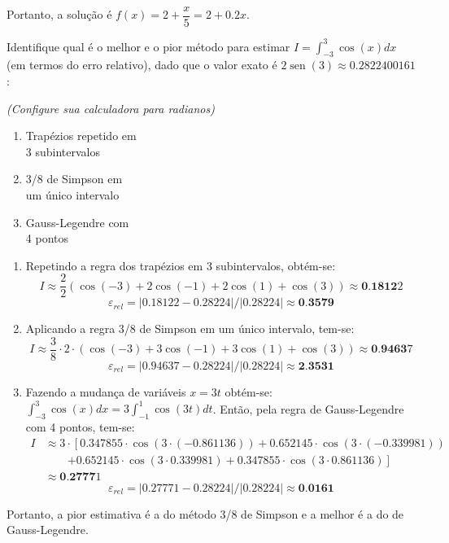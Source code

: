 \documentclass[12pt,a4paper]{article}
\newcommand*\sen{\operatorname{sen}}
\begin{document}
\begin{ExerciseList}
Portanto, a solução é $f(x) = 2 + \dfrac{x}{5} = 2 + 0.2x$.

\Exercise[title={3,0}] Identifique qual é o melhor e o pior método para estimar $\displaystyle I = \int_{-3}^3 \cos(x) dx$ (em termos do erro relativo), dado que o valor exato é $2 \sen(3) \approx 0.2822400161$: 

\textit{(Configure sua calculadora para radianos)}
\begin{multicols}{3}
\begin{enumerate}
\item Trapézios repetido em\\3 subintervalos
\item 3/8 de Simpson em\\ um único intervalo
\item Gauss-Legendre com\\ 4 pontos
\end{enumerate}
\end{multicols}
\Answer
\begin{enumerate}
\item Repetindo a regra dos trapézios em 3 subintervalos, obtém-se:
\[
I \approx \frac{2}{2} \left( \cos(-3) + 2\cos(-1) + 2\cos(1) + \cos(3) \right)
\approx \textbf{0.1812}2
\]
\[
\varepsilon_{rel} = |0.18122 - 0.28224|/|0.28224|
\approx \textbf{0.3579}
\]

\item Aplicando a regra 3/8 de Simpson em um único intervalo, tem-se:
\[
I \approx \frac{3}{8} \cdot 2 \cdot \left( \cos(-3) + 3\cos(-1) + 3\cos(1) + \cos(3) \right)
\approx \textbf{0.9463}7
\]
\[
\varepsilon_{rel} = |0.94637 - 0.28224|/|0.28224|
\approx \textbf{2.3531}
\]

\item Fazendo a mudança de variáveis $x = 3t$ obtém-se:
$\int_{-3}^3 \cos(x) dx = 3 \int_{-1}^1 \cos(3t) dt$.
Então, pela regra de Gauss-Legendre com 4 pontos, tem-se:
\begin{align*}
I & \approx
    3\cdot \left[ 0.347855 \cdot \cos(3\cdot(-0.861136))
  + 0.652145 \cdot \cos(3\cdot(-0.339981)) \right.\\
&  \qquad\left. + 0.652145 \cdot \cos(3\cdot 0.339981)
  + 0.347855 \cdot \cos(3\cdot 0.861136)\right]\\
& \approx \textbf{0.2777}1
\end{align*}
\[
\varepsilon_{rel} = |0.27771- 0.28224|/|0.28224|
\approx \textbf{0.0161}
\]
\end{enumerate}
Portanto, a pior estimativa é a do método 3/8 de Simpson e a melhor é a do de Gauss-Legendre.


\end{ExerciseList}
\end{document}
